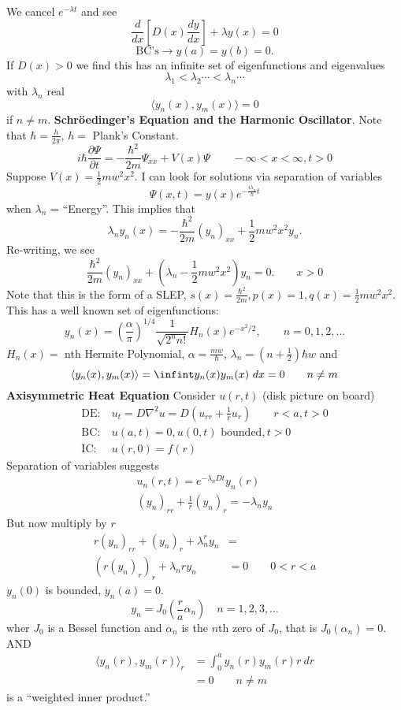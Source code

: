 \documentclass[cm]{article}
\begin{document}
We cancel $e^{- \lambda t}$ and see
\begin{equation*}
\frac{d}{dx} [D(x) \frac{dy}{dx}] + \lambda y(x) = 0
\end{equation*}
$$\text{BC's} \to y(a) = y(b) = 0.$$
If $D(x) > 0$ we find this has an infinite set of eigenfunctions and eigenvalues
$$ \lambda_1 < \lambda_2 \cdots < \lambda_n \cdots$$
with $\lambda_n$ real
$$\langle y_n(x), y_m(x) \rangle = 0$$
if $n \neq m$.
\xex
\ex
{\bf Schr\"oedinger's Equation and the Harmonic Oscillator}.
Note that $\hbar = \frac{h}{2 \pi}$, $h = $ Plank's Constant.
\begin{equation*}
i \hbar \frac{\partial \Psi}{\partial t} = - \frac{\hbar^2}{2m} \Psi_{xx} + V(x)
    \Psi \qquad - \infty < x < \infty, t > 0
\end{equation*}
Suppose $V(x) = \frac12 mw^2x^2$. I can look for solutions via separation of
variables
$$\Psi(x,t) = y(x) e^{-\frac{i \lambda_n}{\hbar} t}$$
when $\lambda_n$ = ``Energy''. This implies that
$$\lambda_n y_n(x) = - \frac{\hbar^2}{2m} (y_n)_{xx} + \frac12 m w^2 x^2 y_n.$$
Re-writing, we see
$$\frac{\hbar^2}{2m}(y_n)_{xx} + (\lambda_n - \frac12 m w^2 x^2)y_n = 0. \qquad
x > 0$$
Note that this is the form of a SLEP, $s(x) = \frac{\hbar^2}{2m}, p(x) = 1, q(x)
= \frac12 mw^2x^2$. This has a well known set of eigenfunctions:
$$y_n(x) = \left(\frac{\alpha}{\pi}\right)^{1/4} \frac{1}{\sqrt{2^nn!}}H_n(x)
    e^{-x^2/2}, \qquad n= 0, 1, 2, \ldots$$
$H_n(x) = $ nth Hermite Polynomial, $\alpha = \frac{mw}{\hbar}$, $\lambda_n =
(n+ \frac12) \hbar w$ and
$$\langle y_n(x), y_m(x) \rangle = \infint y_n(x)y_m(x)~dx = 0 \qquad n \neq m$$
\xex
\ex
{\bf Axisymmetric Heat Equation}
Consider $u(r,t)$ (disk picture on board)
\begin{align*}
\text{DE:}&~ u_t = D \nabla^2 u =D(u_{rr} + \frac{1}{r} u_r) \qquad r < a, t >
0\\
\text{BC:}&~u(a,t) = 0, u(0,t) \text{ bounded}, t > 0 \\
\text{IC:}&~u(r,0) = f(r)
\end{align*}
Separation of variables suggests
\begin{align*}
u_n(r,t) = e^{- \lambda_n D t} y_n(r) \\
(y_n)_{rr} + \frac{1}{r} (y_n)_r = - \lambda_n y_n
\end{align*}
But now multiply by $r$
\begin{align*}
r(y_n)_{rr} + (y_n)_r + \lambda_n^ry_n &= \\
(r(y_n)_r)_r + \lambda_n r y_n &= 0 \qquad 0 < r < a
\end{align*}
$y_n(0)$ is bounded, $y_n(a) = 0$.
$$y_n = J_0(\frac{r}{a} \alpha_n) \quad n = 1,2,3,\ldots$$
wher $J_0$ is a Bessel function and $\alpha_n$ is the $n$th zero of $J_0$, that
is $J_0(\alpha_n) = 0$. AND
\begin{align*}
\langle y_n(r), y_m(r)\rangle_r &= \int_0^a y_n(r)y_m(r) r ~dr \\
&= 0\qquad n \neq m
\end{align*}
is a ``weighted inner product.''
\xex
\end{document}
